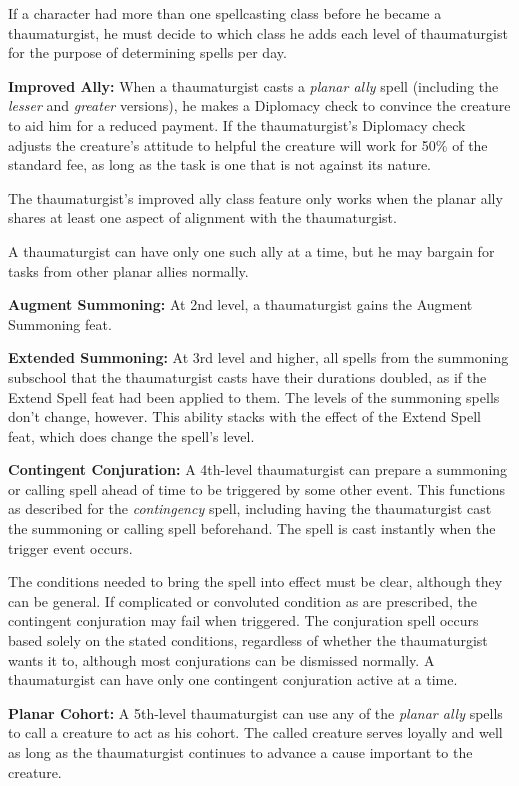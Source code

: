 \documentclass{article}
\begin{document}
If a character had more than one spellcasting class before he became a thaumaturgist, 
he must decide to which class he adds each level of thaumaturgist for the purpose 
of determining spells per day.

\textbf{Improved Ally:} When a thaumaturgist casts a \textit{planar ally }spell 
(including the \textit{lesser }and \textit{greater }versions), he makes a Diplomacy 
check to convince the creature to aid him for a reduced payment. If the thaumaturgist's 
Diplomacy check adjusts the creature's attitude to helpful the creature will work 
for 50\% of the standard fee, as long as the task is one that is not against its 
nature. 

The thaumaturgist's improved ally class feature only works when the planar ally 
shares at least one aspect of alignment with the thaumaturgist.

A thaumaturgist can have only one such ally at a time, but he may bargain for tasks 
from other planar allies normally.

\textbf{Augment Summoning: }At 2nd level, a thaumaturgist gains the Augment Summoning 
feat.

\textbf{Extended Summoning: }At 3rd level and higher, all spells from the summoning 
subschool that the thaumaturgist casts have their durations doubled, as if the 
Extend Spell feat had been applied to them. The levels of the summoning spells 
don't change, however. This ability stacks with the effect of the Extend Spell 
feat, which does change the spell's level.

\textbf{Contingent Conjuration:} A 4th-level thaumaturgist can prepare a summoning 
or calling spell ahead of time to be triggered by some other event. This functions 
as described for the \textit{contingency }spell, including having the thaumaturgist 
cast the summoning or calling spell beforehand. The spell is cast instantly when 
the trigger event occurs. 

The conditions needed to bring the spell into effect must be clear, although they 
can be general. If complicated or convoluted condition as are prescribed, the contingent 
conjuration may fail when triggered. The conjuration spell occurs based solely 
on the stated conditions, regardless of whether the thaumaturgist wants it to, 
although most conjurations can be dismissed normally. A thaumaturgist can have 
only one contingent conjuration active at a time.

\textbf{Planar Cohort:} A 5th-level thaumaturgist can use any of the \textit{planar 
ally }spells to call a creature to act as his cohort. The called creature serves 
loyally and well as long as the thaumaturgist continues to advance a cause important 
to the creature. 
\end{document}
